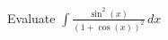 \documentclass[preview]{standalone}
\begin{document}
\begin{center}
Evaluate $\int \frac{\sin^2(x)}{(1 + \cos(x))^2} \, dx$
\end{center}
\end{document}

